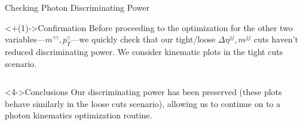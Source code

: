 \documentclass[]{beamer}
\begin{document}
\begin{frame}{Checking Photon Discriminating Power}
    \begin{block}<+(1)->{Confirmation}
        Before proceeding to the optimization for the other two variables---$m^{\gamma \gamma}, p_T^\gamma$---we quickly check that our tight/loose $\Delta \eta^{jj}, m^{jj}$ cuts haven't reduced discriminating power. We consider kinematic plots in the tight cuts scenario.
    \end{block}
    
    \bigskip
    
    \begin{columns}
    \end{columns}
    
    \bigskip
    
    
    \begin{block}<4->{Conclusions}
        Our discriminating power has been preserved (these plots behave similarly in the loose cuts scenario), allowing us to continue on to a photon kinematics optimization routine.
    \end{block}
\end{frame}
\end{document}
